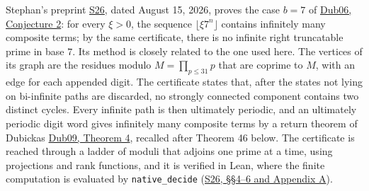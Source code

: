 \documentclass[11pt,reqno]{amsart}
\theoremstyle{definition}
\theoremstyle{remark}
\begin{document}
Stephan's preprint \hyperref[ref-s26]{S26}, dated August 15, 2026, proves
the case \(b=7\) of \hyperref[ref-dub06]{Dub06, Conjecture 2}: for every
\(\xi>0\), the sequence \(\lfloor\xi7^n\rfloor\) contains infinitely many
composite terms; by the same certificate, there is no infinite right
truncatable prime in base \(7\). Its method is closely related to the one
used here. The vertices of its graph are the residues modulo
\(M=\prod_{p\le31}p\) that are coprime to \(M\), with an edge for each
appended digit. The certificate states that, after the states not lying on
bi-infinite paths are discarded, no strongly connected component contains
two distinct cycles. Every infinite path is then ultimately periodic, and
an ultimately periodic digit word gives infinitely many composite terms by
a return theorem of Dubickas \hyperref[ref-dub09]{Dub09, Theorem 4},
recalled after Theorem 46 below. The certificate is reached through a
ladder of moduli that adjoins one prime at a time, using projections and
rank functions, and it is verified in Lean, where the finite computation
is evaluated by \nolinkurl{native_decide} (\hyperref[ref-s26]{S26, §§4--6
and Appendix A}).
\end{document}
